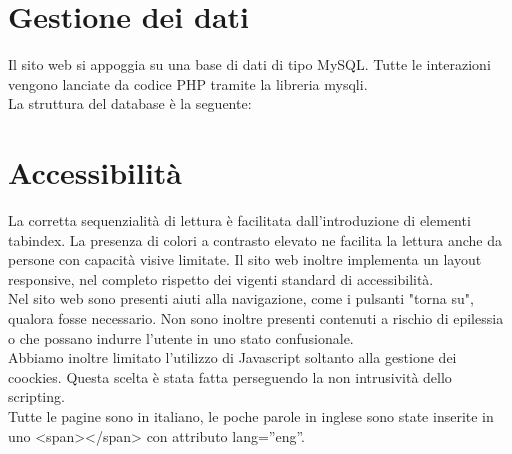 \section{Gestione dei dati}

Il sito web si appoggia su una base di dati di tipo MySQL. Tutte le interazioni vengono lanciate da codice PHP tramite la libreria mysqli.\\
La struttura del database è la seguente:


\section{Accessibilità}

La corretta sequenzialità di lettura è facilitata dall'introduzione di elementi tabindex. La presenza di colori a contrasto elevato ne facilita la lettura anche da persone con capacità visive limitate. Il sito web inoltre implementa un layout responsive, nel completo rispetto dei vigenti standard di accessibilità.\\
Nel sito web sono presenti aiuti alla navigazione, come i pulsanti "torna su", qualora fosse necessario. Non sono inoltre presenti contenuti a rischio di epilessia o che possano indurre l'utente in uno stato confusionale.\\
Abbiamo inoltre limitato l'utilizzo di Javascript soltanto alla gestione dei coockies. Questa scelta è stata fatta perseguendo la non intrusività dello scripting.\\
Tutte le pagine sono in italiano, le poche parole in inglese sono state inserite in uno <span></span> con attributo lang=”eng”.

